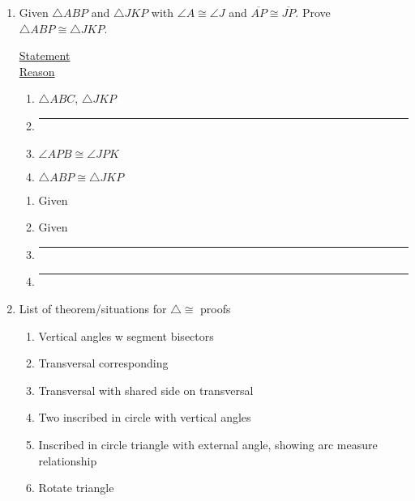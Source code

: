 \documentclass[12pt, twoside]{article}
\begin{document}
\begin{enumerate}
\item Given $\triangle ABP$ and $\triangle JKP$ with $\angle A \cong \angle J$ and $\overline{AP} \cong \overline{JP}$. Prove $\triangle ABP \cong \triangle JKP$.\\[0.5cm]

     \begin{multicols}{2}
       \underline{Statement} \\
       \underline{Reason}
     \end{multicols}
     \begin{multicols}{2}
       \raggedcolumns
       \begin{enumerate}[label={\arabic*)}]
         \item $\triangle ABC$, $\triangle JKP$
         \item \rule{4cm}{0.15mm}%
         \item $\angle APB \cong \angle JPK$ %
 
         \item $\triangle ABP \cong \triangle JKP$
       \end{enumerate}
       \begin{enumerate}[label={\arabic*)}]
         \item Given
         \item Given
         \item \rule{4cm}{0.15mm}
         \item \rule{4cm}{0.15mm}
       \end{enumerate}
     \end{multicols}

\newpage
\item List of theorem/situations for $\triangle \cong$ proofs
    \begin{enumerate}
      \item Vertical angles w segment bisectors
      \item Transversal corresponding
      \item Transversal with shared side on transversal
      \item Two inscribed in circle with vertical angles
      \item Inscribed in circle triangle with external angle, showing arc measure relationship
      \item Rotate triangle
      \end{enumerate}

\end{enumerate}
\end{document}
